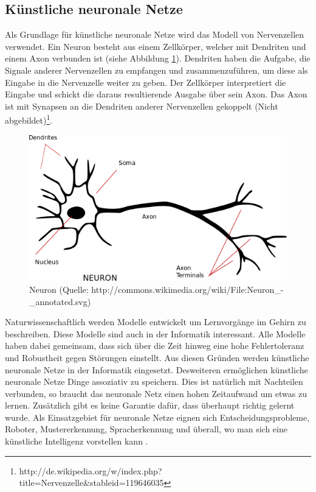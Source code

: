 \documentclass[12pt]{article}
\begin{document}
	\subsection{Künstliche neuronale Netze}
	\label{NN}
		Als Grundlage für künstliche neuronale Netze wird das Modell von Nervenzellen verwendet. Ein Neuron besteht aus einem Zellkörper, welcher mit Dendriten und einem Axon verbunden ist (siehe Abbildung \ref{Neuron}). Dendriten haben die Aufgabe, die Signale anderer Nervenzellen zu empfangen und zusammenzuführen, um diese als Eingabe in die Nervenzelle weiter zu geben. Der Zellkörper interpretiert die Eingabe und schickt die daraus resultierende Ausgabe über sein Axon. Das Axon ist mit Synapsen an die Dendriten anderer Nervenzellen gekoppelt (Nicht abgebildet)\footnote{http://de.wikipedia.org/w/index.php?title=Nervenzelle\&stableid=119646035}.
\begin{figure}[H]
	\includegraphics[scale=0.8]{Neuron_-_annotated.png}
	\caption{Neuron (Quelle: http://commons.wikimedia.org/wiki/File:Neuron\_-\_annotated.svg) }
	\label{Neuron}
\end{figure}		
		
	Naturwissenschaftlich werden Modelle entwickelt um Lernvorgänge im Gehirn zu beschreiben. Diese Modelle sind auch in der Informatik interessant. Alle Modelle haben dabei gemeinsam, dass sich über die Zeit hinweg eine hohe Fehlertoleranz und Robustheit gegen Störungen einstellt. Aus diesen Gründen werden künstliche neuronale Netze in der Informatik eingesetzt.
	 Desweiteren ermöglichen künstliche neuronale Netze Dinge assoziativ zu speichern. Dies ist natürlich mit Nachteilen verbunden, so braucht das neuronale Netz einen hohen Zeitaufwand um etwas zu lernen. Zusätzlich gibt es keine Garantie dafür, dass überhaupt richtig gelernt wurde. Als Einsatzgebiet für neuronale Netze eignen sich Entscheidungsprobleme, Roboter, Mustererkennung, Spracherkennung und überall, wo man sich eine künstliche Intelligenz vorstellen kann \cite{PDP}.
	
\end{document}
